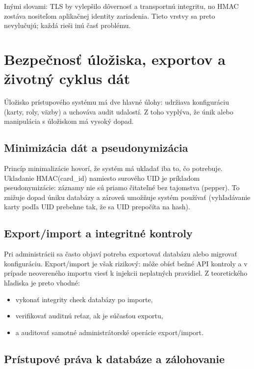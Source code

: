 \documentclass[journal,a4paper,onecolumn]{IEEEtran}
\begin{document}
Inými slovami: TLS by vylepšilo dôvernosť a transportnú integritu, no HMAC zostáva nositeľom aplikačnej identity zariadenia. Tieto vrstvy sa preto nevylučujú; každá rieši inú časť problému.


\section{Bezpečnosť úložiska, exportov a životný cyklus dát}

Úložisko prístupového systému má dve hlavné úlohy: udržiava konfiguráciu (karty, roly, väzby) a uchováva audit udalostí. Z toho vyplýva, že únik alebo manipulácia s úložiskom má vysoký dopad.

\subsection{Minimizácia dát a pseudonymizácia}

Princíp minimalizácie hovorí, že systém má ukladať iba to, čo potrebuje. Ukladanie HMAC(card\_id) namiesto surového UID je príkladom pseudonymizácie: záznamy nie sú priamo čitateľné bez tajomstva (pepper). To znižuje dopad úniku databázy a zároveň umožňuje systém používať (vyhľadávanie karty podľa UID prebehne tak, že sa UID prepočíta na hash).

\subsection{Export/import a integritné kontroly}

Pri administrácii sa často objaví potreba exportovať databázu alebo migrovať konfiguráciu. Export/import je však rizikový: môže obísť bežné API kontroly a v prípade neovereného importu viesť k injekcii neplatných pravidiel. Z teoretického hľadiska je preto vhodné:

\begin{itemize}[leftmargin=*,itemsep=2pt]
  \item vykonať integrity check databázy po importe,
  \item verifikovať auditnú reťaz, ak je súčasťou exportu,
  \item a auditovať samotné administrátorské operácie export/import.
\end{itemize}

\subsection{Prístupové práva k databáze a zálohovanie}
\end{document}
